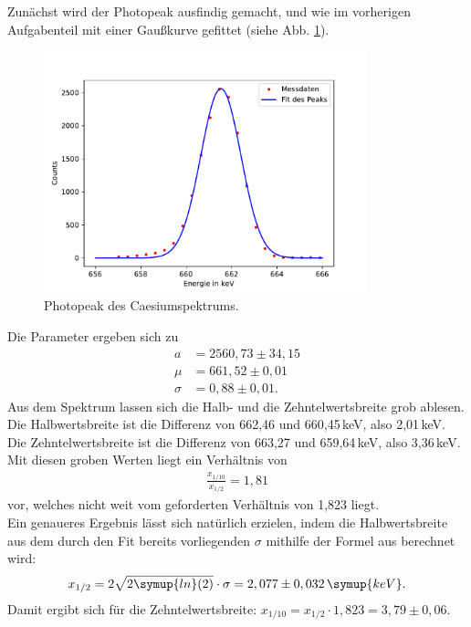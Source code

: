     Zunächst wird der Photopeak ausfindig gemacht, und wie
    im vorherigen Aufgabenteil mit einer Gaußkurve gefittet (siehe Abb.
    \ref{fig:photo}).

    \begin{figure}[H]
      \centering
      \includegraphics[height=7cm]{germanib/photo/photoenergien.pdf}
      \caption{Photopeak des Caesiumspektrums.}
      \label{fig:photo}
    \end{figure}

    Die Parameter ergeben sich zu
    \begin{align*}
      a &= 2560,73\pm 34,15\\
      \mu &= 661,52\pm 0,01\\
      \sigma &= 0,88\pm 0,01.
    \end{align*}
    Aus dem Spektrum lassen sich die Halb- und die Zehntelwertsbreite grob
    ablesen. Die Halbwertsbreite ist die Differenz von 662,46
    und 660,45\,keV, also 2,01\,keV. Die Zehntelwertsbreite ist die Differenz
    von 663,27 und 659,64\,keV, also 3,36\,keV.
    Mit diesen groben Werten liegt ein Verhältnis von
    \begin{align*}
      \frac{x_{1/10}}{x_{1/2}} = 1,81
    \end{align*}
    vor, welches nicht weit vom geforderten Verhältnis von 1,823 liegt.\\
    Ein genaueres Ergebnis lässt sich natürlich erzielen, indem die Halbwertsbreite
    aus dem durch den Fit bereits vorliegenden $\sigma$ mithilfe der Formel aus
    \cite{hwb} berechnet wird:
    \begin{align*}
      x_{1/2}=2\sqrt{2\symup{ln}(2)}\cdot\sigma = 2,077\pm 0,032\,\symup{keV}.\\
    \end{align*}
    Damit ergibt sich für die Zehntelwertsbreite:
    $x_{1/10}=x_{1/2}\cdot 1,823 = 3,79\pm 0,06.$

